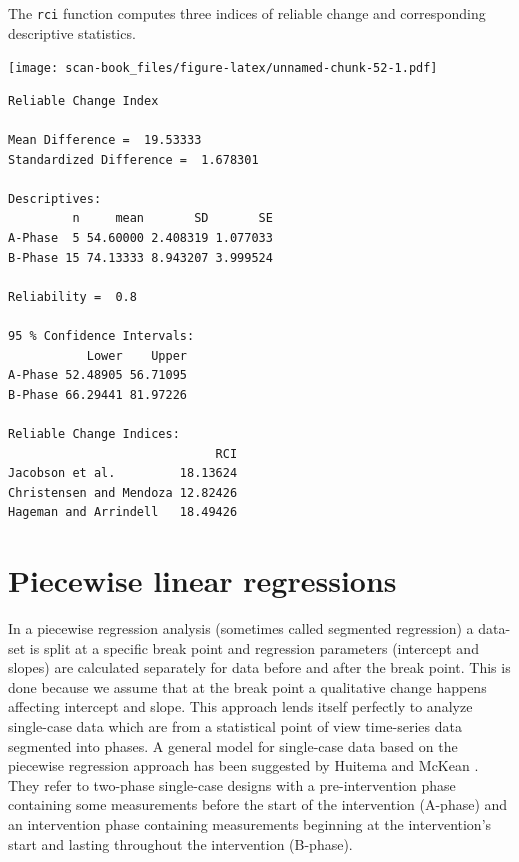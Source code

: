 \documentclass[
]{book}
\newenvironment{Shaded}{\begin{snugshade}}{\end{snugshade}}
\newcommand{\AttributeTok}[1]{\textcolor[rgb]{0.77,0.63,0.00}{#1}}
\newcommand{\ConstantTok}[1]{\textcolor[rgb]{0.00,0.00,0.00}{#1}}
\newcommand{\FloatTok}[1]{\textcolor[rgb]{0.00,0.00,0.81}{#1}}
\newcommand{\FunctionTok}[1]{\textcolor[rgb]{0.00,0.00,0.00}{#1}}
\newcommand{\NormalTok}[1]{#1}
\newcommand{\SpecialCharTok}[1]{\textcolor[rgb]{0.00,0.00,0.00}{#1}}
\begin{document}
The \texttt{rci} function computes three indices of reliable change \citep{wise_methods_2004} and corresponding descriptive statistics.

\begin{Shaded}
\end{Shaded}

\texttt{[image: scan-book\_files/figure-latex/unnamed-chunk-52-1.pdf]}

\begin{verbatim}
Reliable Change Index

Mean Difference =  19.53333 
Standardized Difference =  1.678301 

Descriptives:
         n     mean       SD       SE
A-Phase  5 54.60000 2.408319 1.077033
B-Phase 15 74.13333 8.943207 3.999524

Reliability =  0.8 

95 % Confidence Intervals:
           Lower    Upper
A-Phase 52.48905 56.71095
B-Phase 66.29441 81.97226

Reliable Change Indices:
                             RCI
Jacobson et al.         18.13624
Christensen and Mendoza 12.82426
Hageman and Arrindell   18.49426
\end{verbatim}

\hypertarget{piecewise-linear-regressions}{%
\chapter{Piecewise linear regressions}\label{piecewise-linear-regressions}}

In a piecewise regression analysis (sometimes called segmented regression) a data-set is split at a specific break point and regression parameters (intercept and slopes) are calculated separately for data before and after the break point. This is done because we assume that at the break point a qualitative change happens affecting intercept and slope. This approach lends itself perfectly to analyze single-case data which are from a statistical point of view time-series data segmented into phases. A general model for single-case data based on the piecewise regression approach has been suggested by Huitema and McKean \citet{huitema_design_2000}. They refer to two-phase single-case designs with a pre-intervention phase containing some measurements before the start of the intervention (A-phase) and an intervention phase containing measurements beginning at the intervention's start and lasting throughout the intervention (B-phase).
\end{document}
